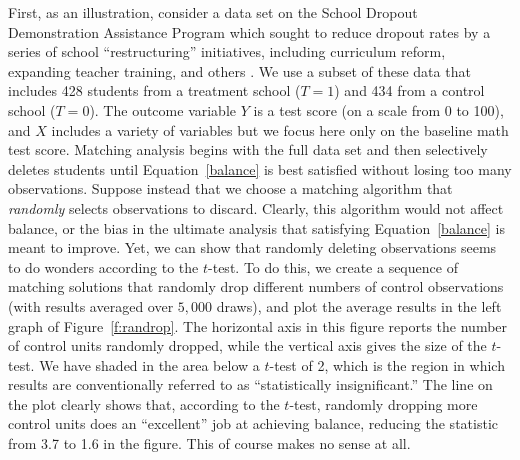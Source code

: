\documentclass[11pt,titlepage]{article}
\begin{document}
First, as an illustration, consider a data set on the School Dropout
Demonstration Assistance Program which sought to reduce dropout rates
by a series of school ``restructuring'' initiatives, including
curriculum reform, expanding teacher training, and others
\citep{AgoDyn04,Stuart04}.  We use a subset of these data that
includes 428 students from a treatment school ($T=1$) and 434 from a
control school ($T=0$).  The outcome variable $Y$ is a test score (on
a scale from 0 to 100), and $X$ includes a variety of variables but we
focus here only on the baseline math test score.  Matching analysis
begins with the full data set and then selectively deletes students
until Equation~\ref{balance} is best satisfied without losing too many
observations.  Suppose instead that we choose a matching algorithm
that \emph{randomly} selects observations to discard.  Clearly, this
algorithm would not affect balance, or the bias in the ultimate
analysis that satisfying Equation~\ref{balance} is meant to improve.
Yet, we can show that randomly deleting observations seems to do
wonders according to the $t$-test.  To do this, we create a sequence
of matching solutions that randomly drop different numbers of control
observations (with results averaged over $5,000$ draws), and plot the
average results in the left graph of Figure~\ref{f:randrop}.  The
horizontal axis in this figure reports the number of control units
randomly dropped, while the vertical axis gives the size of the
$t$-test.  We have shaded in the area below a $t$-test of 2, which is
the region in which results are conventionally referred to as
``statistically insignificant.''  The line on the plot clearly shows
that, according to the $t$-test, randomly dropping more control units
does an ``excellent'' job at achieving balance, reducing the statistic
from 3.7 to 1.6 in the figure.  This of course makes no sense at all.
\end{document}
